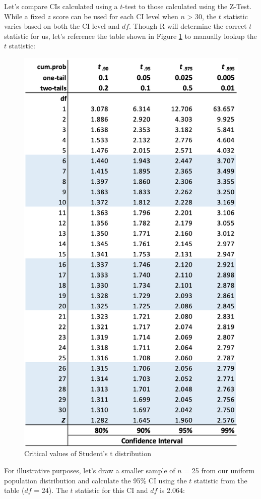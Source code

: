 \documentclass[
]{book}
\begin{document}
Let's compare CIs calculated using a \(t\)-test to those calculated using the Z-Test. While a fixed \(z\) score can be used for each CI level when \(n\) \textgreater{} 30, the \(t\) statistic varies based on both the CI level and \(df\). Though R will determine the correct \(t\) statistic for us, let's reference the table shown in Figure \ref{fig:t-crit} to manually lookup the \(t\) statistic:

\begin{figure}

{\centering \includegraphics[width=0.5\linewidth]{graphics/t-table} 

}

\caption{Critical values of Student's t distribution}\label{fig:t-crit}
\end{figure}

For illustrative purposes, let's draw a smaller sample of \(n\) = 25 from our uniform population distribution and calculate the 95\% CI using the \(t\) statistic from the table (\(df\) = 24). The \(t\) statistic for this CI and \(df\) is 2.064:
\end{document}
